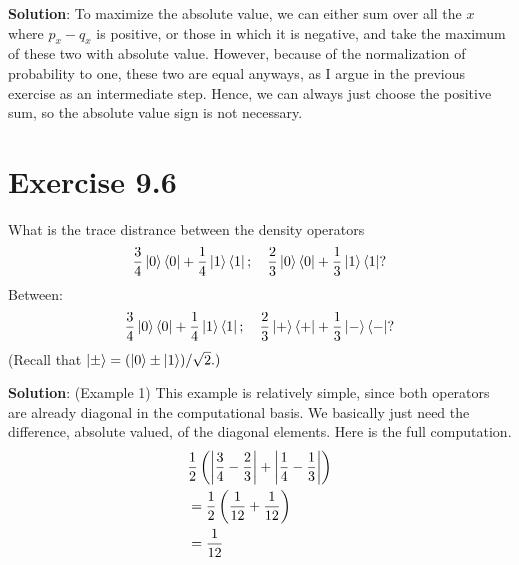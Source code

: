 \documentclass{book}
\begin{document}
    \textbf{Solution}: To maximize the absolute value, we can either sum over all the $x$ where $p_x-q_x$ is positive, or those in which it is negative, and take the maximum of these two with absolute value. However, because of the normalization of probability to one, these two are equal anyways, as I argue in the previous exercise as an intermediate step. Hence, we can always just choose the positive sum, so the absolute value sign is not necessary. 
    
\section*{Exercise 9.6}
    What is the trace distrance between the density operators
    \begin{align}
        \frac{3}{4}\ket{0}\bra{0}+\frac{1}{4}\ket{1}\bra{1};\quad \frac{2}{3}\ket{0}\bra{0}+\frac{1}{3}\ket{1}\bra{1}?
    \end{align}
    Between:
    \begin{align}
        \frac{3}{4}\ket{0}\bra{0}+\frac{1}{4}\ket{1}\bra{1};\quad \frac{2}{3}\ket{+}\bra{+}+\frac{1}{3}\ket{-}\bra{-}?
    \end{align}
    (Recall that $\ket{\pm} = (\ket{0}\pm\ket{1})/\sqrt{2}.)$
    
    \textbf{Solution}: (Example 1) This example is relatively simple, since both operators are already diagonal in the computational basis. We basically just need the difference, absolute valued, of the diagonal elements. Here is the full computation.
    \begin{align}
    \begin{aligned}
         &\frac{1}{2}\left(\abs{\frac{3}{4}-\frac{2}{3}}+\abs{\frac{1}{4}-\frac{1}{3}}\right) \\
         &= \frac{1}{2}\left(\frac{1}{12}+\frac{1}{12}\right) \\
         &= \frac{1}{12}
    \end{aligned}
    \end{align}
    
\end{document}
